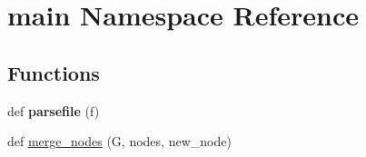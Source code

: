 \hypertarget{namespacemain}{}\section{main Namespace Reference}
\label{namespacemain}
\subsection*{Functions}
\begin{DoxyCompactItemize}
\item 
\mbox{\label{namespacemain_aae54088deb902f6478332bfaf91f888f}} 
def {\bfseries parsefile} (f)
\item 
def \mbox{\hyperlink{namespacemain_a42969f03e14f9d500397028177ed72ec}{merge\+\_\+nodes}} (G, nodes, new\+\_\+node)
\end{DoxyCompactItemize}
